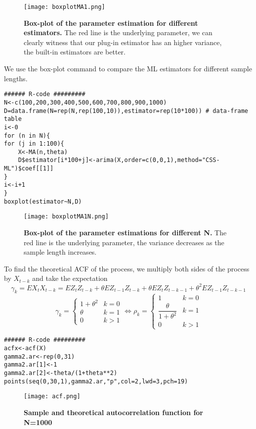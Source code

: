\documentclass{article}
\begin{document}
\begin{figure}[H]
	\centering
  	\texttt{[image: boxplotMA1.png]}
  	\caption{\textbf{Box-plot of the parameter estimation for different estimators.} The red line is the underlying parameter, we can clearly witness that our plug-in estimator has an higher variance, the built-in estimators are better.}
\end{figure}

We use the box-plot command to compare the ML estimators for different sample lengths.
\begin{verbatim}
###### R-code #########
N<-c(100,200,300,400,500,600,700,800,900,1000)
D=data.frame(N=rep(N,rep(100,10)),estimator=rep(10*100)) # data-frame table 
i<-0
for (n in N){
for (j in 1:100){
	X<-MA(n,theta)
	D$estimator[i*100+j]<-arima(X,order=c(0,0,1),method="CSS-ML")$coef[[1]]
}
i<-i+1
}
boxplot(estimator~N,D)
\end{verbatim}

\begin{figure}[H]
	\centering
  	\texttt{[image: boxplotMA1N.png]}
  	\caption{\textbf{Box-plot of the parameter estimations for different N.} The red line is the underlying parameter, the variance decreases as the sample length increases.}
\end{figure}

To find the theoretical ACF of the process, we multiply both sides of the process
by $X_{t-k}$ and take the expectation
\[
\gamma_k=EX_{t}X_{t-k}=EZ_{t}Z_{t-k}+\theta EZ_{t-1}Z_{t-k}+\theta EZ_{t}Z_{t-k-1}+\theta^2EZ_{t-1}Z_{t-k-1}
\]
$$
\gamma_k=
\left\{
\begin{array}{cc}
1+\theta^2  & 
k=0  \\
\theta & 
k=1  \\
0 & 
k>1  
\end{array}
\right.
\iff
\rho_k=
\left\{
\begin{array}{cc}
 1 & k=0 \\
 \dfrac{\theta}{1+\theta^2} & k=1\\
 0 & k>1
    \end{array}
\right. 
$$

\begin{verbatim}
###### R-code #########
acfx<-acf(X)
gamma2.ar<-rep(0,31)
gamma2.ar[1]<-1
gamma2.ar[2]<-theta/(1+theta**2)
points(seq(0,30,1),gamma2.ar,"p",col=2,lwd=3,pch=19)
\end{verbatim}


\begin{figure}[H]
	\centering
  	\texttt{[image: acf.png]}
  	\caption{\textbf{Sample and theoretical autocorrelation function for N=1000} }
\end{figure}
\end{document}
